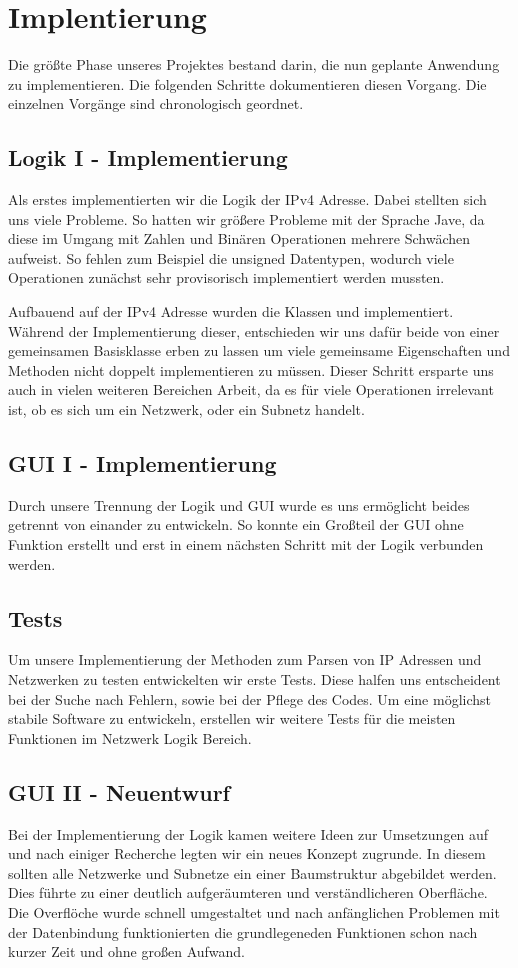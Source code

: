 \section{Implentierung}
Die größte Phase unseres Projektes bestand darin, die nun geplante Anwendung zu implementieren.
Die folgenden Schritte dokumentieren diesen Vorgang. Die einzelnen Vorgänge sind chronologisch geordnet.

\subsection{Logik I - Implementierung}
Als erstes implementierten wir die Logik der IPv4 Adresse. Dabei stellten sich uns viele
Probleme. So hatten wir größere Probleme mit der Sprache Jave, da diese im Umgang mit
Zahlen und Binären Operationen mehrere Schwächen aufweist. So fehlen zum Beispiel die
unsigned Datentypen, wodurch viele Operationen zunächst sehr provisorisch implementiert
werden mussten.

Aufbauend auf der IPv4 Adresse wurden die Klassen  und  implementiert.
Während der Implementierung dieser, entschieden wir uns dafür beide von einer gemeinsamen Basisklasse
 erben zu lassen um viele gemeinsame Eigenschaften und Methoden nicht doppelt
implementieren zu müssen.
Dieser Schritt ersparte uns auch in vielen weiteren Bereichen Arbeit, da es für viele Operationen
irrelevant ist, ob es sich um ein Netzwerk, oder ein Subnetz handelt.

\subsection{GUI I - Implementierung}
Durch unsere Trennung der Logik und GUI wurde es uns ermöglicht beides getrennt von einander
zu entwickeln. So konnte ein Großteil der GUI ohne Funktion erstellt und erst in einem nächsten Schritt
mit der Logik verbunden werden.

\subsection{Tests}
Um unsere Implementierung der Methoden zum Parsen von IP Adressen und Netzwerken zu testen entwickelten
wir erste Tests. Diese halfen uns entscheident bei der Suche nach Fehlern, sowie bei der Pflege des Codes.
Um eine möglichst stabile Software zu entwickeln, erstellen wir weitere Tests für die meisten Funktionen
im Netzwerk Logik Bereich. 

\subsection{GUI II - Neuentwurf}
Bei der Implementierung der Logik kamen weitere Ideen zur Umsetzungen auf und nach einiger Recherche
legten wir ein neues Konzept zugrunde. In diesem sollten alle Netzwerke und Subnetze ein einer
Baumstruktur abgebildet werden. Dies führte zu einer deutlich aufgeräumteren und
verständlicheren Oberfläche.
Die Overflöche wurde schnell umgestaltet und nach anfänglichen Problemen mit der Datenbindung
funktionierten die grundlegeneden Funktionen schon nach kurzer Zeit und ohne großen Aufwand.

